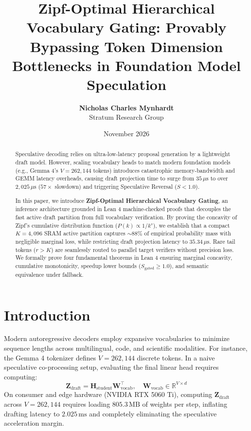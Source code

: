 \documentclass[11pt,a4paper]{article}
\title{\textbf{Zipf-Optimal Hierarchical Vocabulary Gating: Provably Bypassing Token Dimension Bottlenecks in Foundation Model Speculation}}
\author{
  \textbf{Nicholas Charles Mynhardt} \\
  Stratum Research Group
}
\date{November 2026}
\begin{document}
\maketitle

\begin{abstract}
Speculative decoding relies on ultra-low-latency proposal generation by a lightweight draft model. However, scaling vocabulary heads to match modern foundation models (e.g., Gemma 4's $V = 262,144$ tokens) introduces catastrophic memory-bandwidth and GEMM latency overheads, causing draft projection time to surge from $35\,\mu\text{s}$ to over $2,025\,\mu\text{s}$ ($57\times$ slowdown) and triggering Speculative Reversal ($S < 1.0$).

In this paper, we introduce \textbf{Zipf-Optimal Hierarchical Vocabulary Gating}, an inference architecture grounded in Lean 4 machine-checked proofs that decouples the fast active draft partition from full vocabulary verification. By proving the concavity of Zipf's cumulative distribution function ($P(k) \propto 1/k^s$), we establish that a compact $K=4,096$ SRAM active partition captures $\sim 88\%$ of empirical probability mass with negligible marginal loss, while restricting draft projection latency to $35.34\,\mu\text{s}$. Rare tail tokens ($r > K$) are seamlessly routed to parallel target verifiers without precision loss. We formally prove four fundamental theorems in Lean 4 ensuring marginal concavity, cumulative monotonicity, speedup lower bounds ($S_{\text{gated}} \ge 1.0$), and semantic equivalence under fallback.
\end{abstract}

\section{Introduction}
Modern autoregressive decoders employ expansive vocabularies to minimize sequence lengths across multilingual, code, and scientific modalities. For instance, the Gemma 4 tokenizer defines $V = 262,144$ discrete tokens. In a naive speculative co-processing setup, evaluating the final linear head requires computing:
\begin{equation}
\mathbf{Z}_{\text{draft}} = \mathbf{H}_{\text{student}} \mathbf{W}_{\text{vocab}}^\top, \quad \mathbf{W}_{\text{vocab}} \in \mathbb{R}^{V \times d}
\end{equation}
On consumer and edge hardware (NVIDIA RTX 5060 Ti), computing $\mathbf{Z}_{\text{draft}}$ across $V = 262,144$ requires loading $805.3\,\text{MB}$ of weights per step, inflating drafting latency to $2.025\,\text{ms}$ and completely eliminating the speculative acceleration margin.
\end{document}
